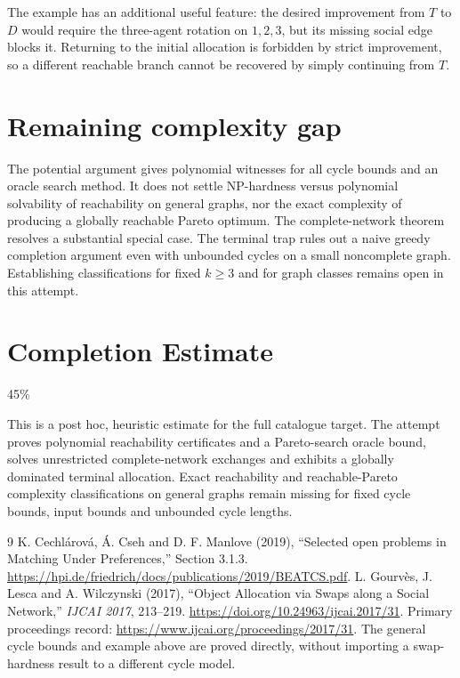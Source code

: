 \documentclass[11pt,a4paper]{article}
\theoremstyle{definition}
\theoremstyle{remark}
\begin{document}
The example has an additional useful feature: the desired improvement from $T$ to $D$ would require the three-agent rotation on $1,2,3$, but its missing social edge blocks it. Returning to the initial allocation is forbidden by strict improvement, so a different reachable branch cannot be recovered by simply continuing from $T$.

\section{Remaining complexity gap}
The potential argument gives polynomial witnesses for all cycle bounds and an oracle search method. It does not settle NP-hardness versus polynomial solvability of reachability on general graphs, nor the exact complexity of producing a globally reachable Pareto optimum. The complete-network theorem resolves a substantial special case. The terminal trap rules out a naive greedy completion argument even with unbounded cycles on a small noncomplete graph. Establishing classifications for fixed $k\geq3$ and for graph classes remains open in this attempt.

\section{Completion Estimate}
45\%

This is a post hoc, heuristic estimate for the full catalogue target.
The attempt proves polynomial reachability certificates and a Pareto-search oracle bound, solves unrestricted complete-network exchanges and exhibits a globally dominated terminal allocation. Exact reachability and reachable-Pareto complexity classifications on general graphs remain missing for fixed cycle bounds, input bounds and unbounded cycle lengths.

\begin{thebibliography}{9}
 K. Cechl\'arov\'a, \'A. Cseh and D. F. Manlove (2019), ``Selected open problems in Matching Under Preferences,'' Section 3.1.3. \url{https://hpi.de/friedrich/docs/publications/2019/BEATCS.pdf}.
 L. Gourv\`es, J. Lesca and A. Wilczynski (2017), ``Object Allocation via Swaps along a Social Network,'' \emph{IJCAI 2017}, 213--219. \url{https://doi.org/10.24963/ijcai.2017/31}. Primary proceedings record: \url{https://www.ijcai.org/proceedings/2017/31}. The general cycle bounds and example above are proved directly, without importing a swap-hardness result to a different cycle model.
\end{thebibliography}
\end{document}
